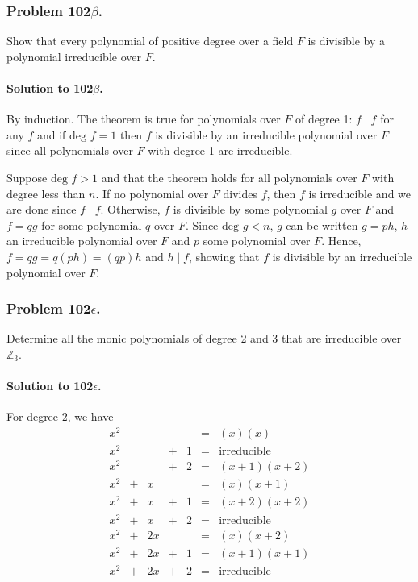\subsubsection{Problem 102$\beta$.}
Show that every polynomial of positive degree over a field $F$ is divisible
by a polynomial irreducible over $F$.

\paragraph*{Solution to 102$\beta$.}
By induction. The theorem is true for polynomials over $F$ of degree 1: $f \mid f$ for
any $f$ and if $\mbox{deg } f = 1$ then $f$ is divisible by an irreducible
polynomial over $F$ since all polynomials over $F$ with degree 1 are irreducible.

Suppose $\mbox{deg } f > 1$ and that the theorem holds for all polynomials over $F$
with degree less than $n$. If no polynomial over $F$ divides $f$, then $f$
is irreducible and we are done since $f \mid f$. Otherwise, $f$ is divisible
by some polynomial $g$ over $F$ and $f = qg$ for some polynomial $q$ over $F$.
Since $\mbox{deg } g < n$, $g$ can be written $g = ph$, $h$ an irreducible
polynomial over $F$ and $p$ some polynomial over $F$. Hence, $f = qg = q(ph)
= (qp)h$ and $h \mid f$, showing that $f$ is divisible by an irreducible polynomial
over $F$.

\subsubsection{Problem 102$\epsilon$.}
Determine all the monic polynomials of degree 2 and 3 that are irreducible over
$\mathbb{Z}_3$.

\paragraph*{Solution to 102$\epsilon$.}
For degree 2, we have
$$
\begin{array}{ccccccl}
x^2 &   &    &   &   & = & (x)(x) \\
x^2 &   &    & + & 1 & = & \mbox{irreducible} \\
x^2 &   &    & + & 2 & = & (x+1)(x+2) \\
x^2 & + &  x &   &   & = & (x)(x+1) \\
x^2 & + &  x & + & 1 & = & (x+2)(x+2) \\
x^2 & + &  x & + & 2 & = & \mbox{irreducible} \\
x^2 & + & 2x &   &   & = & (x)(x+2) \\
x^2 & + & 2x & + & 1 & = & (x+1)(x+1) \\
x^2 & + & 2x & + & 2 & = & \mbox{irreducible} \\
\end{array}
$$

